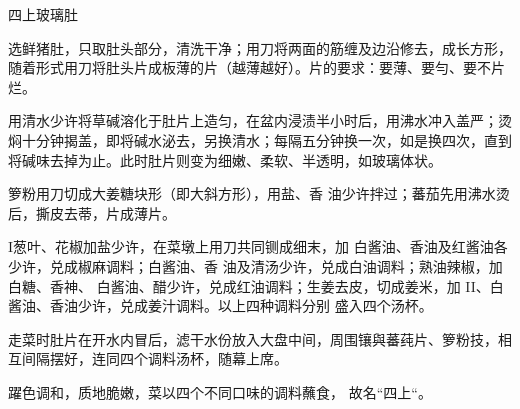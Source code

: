 \begin{recipe}{四上玻璃肚}

\ingredients


\cooking

\step 选鲜猪肚，只取肚头部分，清洗干净；用刀将两面的筋缠及边沿修去，成长方形，随着形式用刀将肚头片成板薄的片（越薄越好）。片的要求：要薄、要勻、要不片烂。

\step 用清水少许将草碱溶化于肚片上造匀，在盆内浸渍半小时后，用沸水冲入盖严；烫焖十分钟揭盖，即将碱水泌去，另换清水；每隔五分钟换一次，如是换四次，直到将碱味去掉为止。此时肚片则变为细嫩、柔软、半透明，如玻璃体状。

箩粉用刀切成大姜糖块形（即大斜方形），用盐、香 油少许拌过；蕃茄先用沸水烫后，撕皮去蒂，片成薄片。

I葱叶、花椒加盐少许，在菜墩上用刀共同铡成细末，加 白酱油、香油及红酱油各少许，兑成椒麻调料；白酱油、香 油及清汤少许，兑成白油调料；熟油辣椒，加白糖、香神、 白酱油、醋少许，兑成红油调料；生姜去皮，切成姜米，加 II、白酱油、香油少许，兑成姜汁调料。以上四种调料分别 盛入四个汤杯。

\step 走菜时肚片在开水内冒后，滤干水份放入大盘中间，周围镶與蕃莼片、箩粉技，相互间隔摆好，连同四个调料汤杯，随幕上席。

\notes

躍色调和，质地脆嫩，菜以四个不同口味的调料蘸食， 故名“四上“。

\end{recipe}


